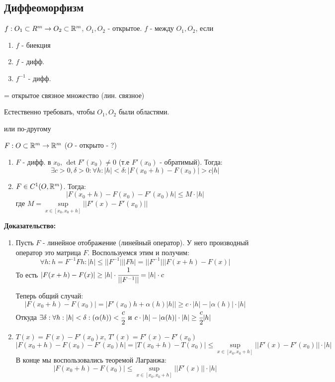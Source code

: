 \subsection{Диффеоморфизм}

 $f: O_1 \subset R^m \rightarrow O_2 \subset \mathbb{R}^m$, $O_1,O_2$ - открытое. $f$ -  между $O_1,O_2$, если
\begin{enumerate}
    \item $f$ - биекция
    \item $f$ - дифф.
    \item $f^{-1}$ - дифф.
\end{enumerate}

  = открытое связное множество (лин. связное)

Естественно требовать, чтобы $O_1, O_2$ были областями. 




 или по-другому


$F: O \subset \mathbb{R}^m \rightarrow \mathbb{R}^m$ ($O$ - открыто - ?)
\begin{enumerate}
    \item $F$ - дифф. в $x_0$, $\det F'(x_0) \neq 0$ (т.е $F'(x_0)$ - обратимый). Тогда: $$\exists c>0,\delta > 0: \forall h: |h|<\delta : |F(x_0+ h)-F(x_0)| > c|h|$$
    \item $F \in C^1(O, \mathbb{R}^m)$. Тогда:
    $$|F(x_0+h)-F(x_0)-F'(x_0)h|\leq M \cdot |h|$$
    где $M = \sup\limits_{x \in [x_0,x_0+h]} ||F'(x) - F'(x_0)||$
\end{enumerate}

\textbf{Доказательство:}
\begin{enumerate}
    \item Пусть $F$ - линейное отображение (линейный оператор). 
    У него производный оператор это матрица $F$. Воспользуемся этим и получим:
    $$\forall h : h = F^{-1}Fh : |h| \leq ||F^{-1}|||Fh| = ||F^{-1}|||F(x+h)-F(x)|$$
    То есть $|F(x+h)-F(x)| \geq |h| \cdot \cfrac{1}{||F^{-1}||} = |h| \cdot c$

    Теперь общий случай: 
    $$|F(x_0 + h)-F(x_0)| = |F'(x_0)h + \alpha(h) |h|| \geq c\cdot |h| - |\alpha(h)| \cdot |h|$$
    Откуда $\exists \delta : \forall h: |h|<\delta : (\alpha(h))<\cfrac{c}{2}$ и $c\cdot |h| - |\alpha(h)| \cdot |h| \geq \cfrac{c}{2}|h|$

\item 

$T(x) = F(x) -F'(x_0) x$, $T'(x) = F'(x) - F'(x_0)$
$$|F(x_0+ h)-F(x_0) - F'(x_0) h| =| T(x_0+h)-T(x_0)| \leq \sup\limits_{x \in [x_0,x_0+h]}||F'(x)-F'(x_0)|| \cdot | h|$$
В конце мы воспользовались теоремой Лагранжа:
$$|F(x_0+h) - F(x_0)|\leq \sup\limits_{x\in[x_0,x_0 + h]} ||F'(x) || \cdot |h|$$

\end{enumerate}

